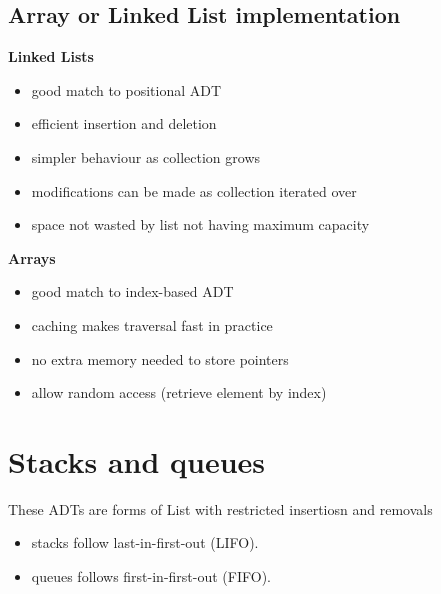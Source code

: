 \documentclass[12pt]{article}
\newcommand{\1}{\space \quad}
\newcommand{\2}{\quad \quad \quad}
\newcommand{\3}{\quad \quad \quad \quad \space}
\newcommand{\4}{\quad \quad \quad \quad \quad \quad}
\begin{document}
\subsection{Array or Linked List implementation}
\textbf{Linked Lists}
\begin{itemize}
  \item good match to positional ADT
  \item efficient insertion and deletion
  \item simpler behaviour as collection grows
  \item modifications can be made as collection iterated over
  \item space not wasted by list not having maximum capacity
\end{itemize}
\textbf{Arrays}
\begin{itemize}
  \item good match to index-based ADT
  \item caching makes traversal fast in practice
  \item no extra memory needed to store pointers
  \item allow random access (retrieve element by index)
\end{itemize}

\section{Stacks and queues}
These ADTs are forms of List with restricted insertiosn and removals
\begin{itemize} 
  \item stacks follow last-in-first-out (LIFO).
  \item queues follows first-in-first-out (FIFO).
\end{itemize}
\newpage
\end{document}

